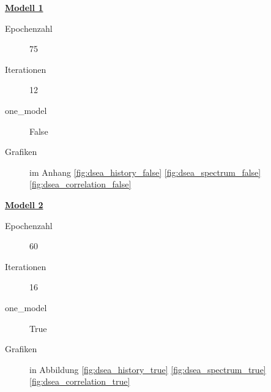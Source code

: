 \begin{minipage}{0.44\textwidth}
    {\color{tugreen} \underline{\textbf{Modell 1}}}
    \begin{description}
        \item [Epochenzahl] 75
        \item [Iterationen] 12
        \item [one\_model] False
        \item [Grafiken] im Anhang \ref{fig:dsea_history_false} \ref{fig:dsea_spectrum_false} \ref{fig:dsea_correlation_false}
    \end{description}
\end{minipage}%
\vline
\hfill
\begin{minipage}{0.48\textwidth}
    {\color{tugreen} \underline{\textbf{Modell 2}}}
    \begin{description}
        \item [Epochenzahl] 60
        \item [Iterationen] 16
        \item [one\_model] True
        \item [Grafiken] in Abbildung \ref{fig:dsea_history_true} \ref{fig:dsea_spectrum_true} \ref{fig:dsea_correlation_true}
    \end{description}
\end{minipage}%

